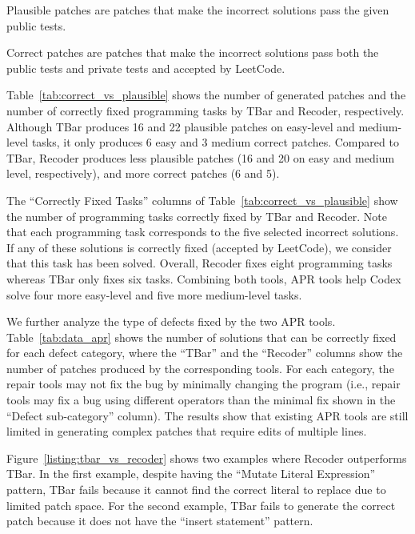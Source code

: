 \begin{description}[leftmargin=*]
\item [Plausible patches.] Plausible patches are patches that make the incorrect solutions pass the given public tests.
\item[Correct patches.] Correct patches are patches that make the incorrect solutions pass both the public tests and private tests and accepted by LeetCode.

\end{description}

Table~\ref{tab:correct_vs_plausible} shows the number of generated patches and the number of correctly fixed programming tasks by TBar and Recoder, respectively. Although TBar produces 16 and 22 plausible patches on easy-level and medium-level tasks, it only produces 6 easy and 3 medium correct patches. Compared to TBar, Recoder produces less plausible patches (16 and 20 on easy and medium level, respectively), and more correct patches (6 and 5).

The ``Correctly Fixed Tasks'' columns of Table~\ref{tab:correct_vs_plausible} show the number of programming tasks correctly fixed by TBar and Recoder. Note that each programming task corresponds to the five selected incorrect solutions. If any of these solutions is correctly fixed (accepted by LeetCode), we consider that this task has been solved. Overall, Recoder fixes eight programming tasks whereas TBar only fixes six tasks. Combining both tools, APR tools help Codex solve four more easy-level and five more medium-level tasks.

We further analyze the type of defects fixed by the two APR tools. Table~\ref{tab:data_apr} shows the number of solutions that can be correctly fixed for each defect category, where the ``TBar'' and the ``Recoder'' columns show the number of patches produced by the corresponding tools. For each category, the repair tools may not fix the bug by minimally changing the program (i.e., repair tools may fix a bug using different operators than the minimal fix shown in the ``Defect sub-category'' column). The results show that existing APR tools are still limited in generating complex patches that require edits of multiple lines.

Figure~\ref{listing:tbar_vs_recoder} shows two examples where Recoder outperforms TBar. In the first example, despite having the ``Mutate Literal Expression'' pattern, TBar fails because it cannot find the correct literal to replace due to limited patch space. For the second example, TBar fails to generate the correct patch because it does not have the ``insert statement'' pattern.

